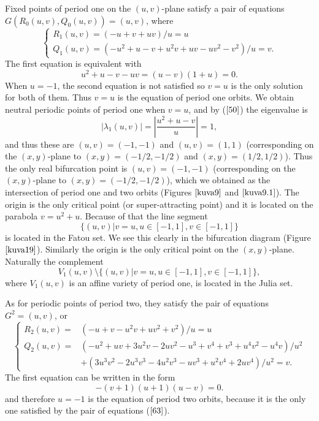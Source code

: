 \documentclass[12pt,a4paper]{amsart}
\numberwithin{equation}{section}
\numberwithin{lause}{section}
\begin{document}
Fixed points of period one on the $(u,v)$-plane satisfy a pair of equations \\ $G(R_{0}(u,v),Q_{0}(u,v))=(u,v)$, where
\begin{equation}
\left\{\begin{array}{l}
      R_{1}(u,v)=(-u+v+uv)/u=u \\
      Q_{1}(u,v)= (-u^{2}+u-v+u^{2}v+uv-uv^{2}-v^{2})/u=v.\label{61}
\end{array}\right.
\end{equation}
The first equation is equivalent with
\begin{displaymath}
u^{2}+u-v-uv=(u-v)(1+u)=0.
\end{displaymath}
When $u=-1$, the second equation is not satisfied so $v=u$ is the only solution for both of them. Thus $v=u$ is the equation of period one orbits.
We obtain neutral periodic points of period one when $v=u$, and by ($\ref{50}$) the eigenvalue is
\begin{displaymath}
|\lambda_{1}(u,v)|=\left|\frac {{u}^{2}+u-v}{u}\right|=1,
\end{displaymath}
 and thus these are $(u,v)=(-1,-1)$ and $(u,v)=(1,1)$ (corresponding on the $(x,y)$-plane to $(x,y)=(-1/2,-1/2)$ and $(x,y)=(1/2,1/2)$).
Thus the only real bifurcation point is $(u,v)=(-1,-1)$ (corresponding on the $(x,y)$-plane to $(x,y)=(-1/2,-1/2)$), which we obtained as the intersection of period one and two orbits (Figures $\ref{kuva9}$ and $\ref{kuva9.1}$).
The origin is the only critical point (or super-attracting point) and it is located on the parabola $v=u^{2}+u$. Because of that the line segment
\begin{displaymath}
\{(u,v)|v=u,u\in[-1,1],v\in[-1,1]\}
\end{displaymath}
is located in the Fatou set. We see this clearly in the bifurcation diagram (Figure $\ref{kuva19}$).
Similarly the origin is the only critical point on the $(x,y)$-plane.
 Naturally the complement
 \begin{displaymath}
V_{1}(u,v) \setminus \{(u,v)|v=u,u\in[-1,1],v\in[-1,1]\},
\end{displaymath}
where $V_{1}(u,v)$ is an affine variety of period one, is located in the Julia set.

As for periodic points of period two, they satisfy the pair of equations $G^{2}=(u,v)$, or
\begin{equation}
\left\{\begin{array}{ll}
      R_{2}(u,v)=&(-u+v-u^{2}v+uv^{2}+v^{2})/u=u \\
      Q_{2}(u,v)=&(-u^{2}+uv+3u^{2}v-2uv^{2}-u^{3}+v^{4}+v^{3}+u^{4}v^{2}-u^{4}v)/u^{2} \\
&+(3u^{3}v^{2}-2u^{3}v^{3}-4u^{2}v^{3}-uv^{3}+u^2v^{4}+2uv^{4})/u^{2}=v.\label{63}
\end{array}\right.
\end{equation}
The first equation can be written in the form
\begin{displaymath}
-(v+1)(u+1)(u-v)=0.
\end{displaymath}
and therefore $u=-1$ is the equation of period two orbits, because it is the only one satisfied by the pair of equations ($\ref{63}$).
\end{document}
